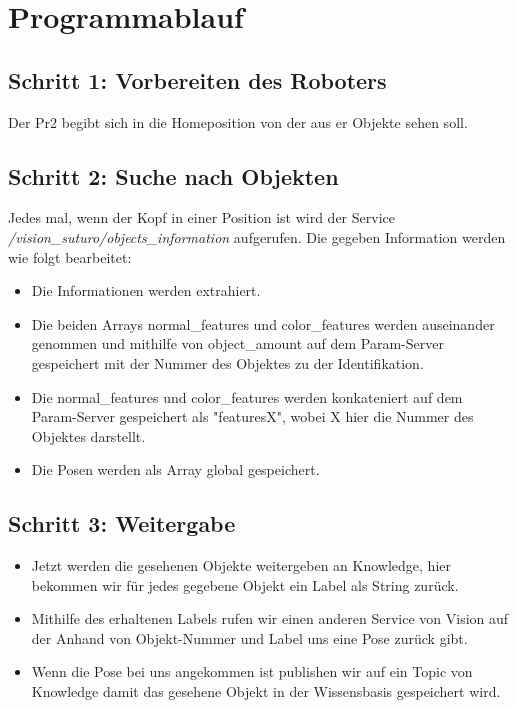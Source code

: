 \documentclass{suturo}
\begin{document}
\section*{Programmablauf}
\subsection*{Schritt 1: Vorbereiten des Roboters}
Der Pr2 begibt sich in die Homeposition von der aus er Objekte sehen soll. 

\subsection*{Schritt 2: Suche nach Objekten}
Jedes mal, wenn der Kopf in einer Position ist wird der Service \textit{/vision\_suturo/objects\_information} aufgerufen. Die gegeben Information werden wie folgt bearbeitet:

\begin{itemize} 
\item Die Informationen werden extrahiert.
\item Die beiden Arrays normal\_features und color\_features werden auseinander genommen und mithilfe von object\_amount auf dem Param-Server gespeichert mit der Nummer des Objektes zu der Identifikation.
\item Die normal\_features und color\_features werden konkateniert auf dem Param-Server gespeichert als "featuresX", wobei X hier die Nummer des Objektes darstellt.
\item Die Posen werden als Array global gespeichert.
\end{itemize}


\subsection*{Schritt 3: Weitergabe} 

\begin{itemize} 
\item Jetzt werden die gesehenen Objekte weitergeben an Knowledge, hier bekommen wir für jedes gegebene Objekt ein Label als String zurück.
\item Mithilfe des erhaltenen Labels rufen wir einen anderen Service von Vision auf der Anhand von Objekt-Nummer und Label uns eine Pose zurück gibt.  
\item Wenn die Pose bei uns angekommen ist publishen wir auf ein Topic von Knowledge damit das gesehene Objekt in der Wissensbasis gespeichert wird.
\end{itemize}
\end{document}
